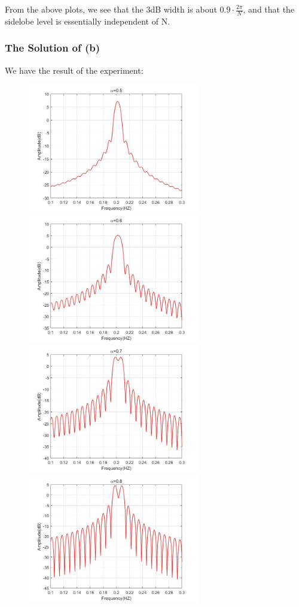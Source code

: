 \documentclass[UTF-8, a4paper, 12pt]{ctexart}
\begin{document}
From the above plots, we see that the 3dB width is about $0.9\cdot\frac{2\pi}{N}$, and that the sidelobe level is essentially independent of N.

\subsubsection{The Solution of (b)}
We have the result of the experiment:
\begin{figure}[htbp]
    \centering
    \includegraphics[width=7.5cm]{2/alpha05.jpg}
    \includegraphics[width=7.5cm]{2/alpha06.jpg}
    \includegraphics[width=7.5cm]{2/alpha07.jpg}
    \includegraphics[width=7.5cm]{2/alpha08.jpg}

\end{figure}
\end{document}
